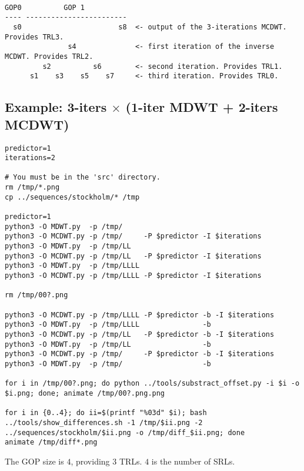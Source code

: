 \begin{verbatim}

GOP0          GOP 1
---- ------------------------
  s0                       s8  <- output of the 3-iterations MCDWT. Provides TRL3.
               s4              <- first iteration of the inverse MCDWT. Provides TRL2.
         s2          s6        <- second iteration. Provides TRL1.
      s1    s3    s5    s7     <- third iteration. Provides TRL0.

\end{verbatim}

\subsection*{Example: 3-iters $\times$ (1-iter MDWT + 2-iters MCDWT)}

\begin{verbatim}
predictor=1
iterations=2

# You must be in the 'src' directory.
rm /tmp/*.png
cp ../sequences/stockholm/* /tmp

predictor=1
python3 -O MDWT.py  -p /tmp/
python3 -O MCDWT.py -p /tmp/     -P $predictor -I $iterations
python3 -O MDWT.py  -p /tmp/LL
python3 -O MCDWT.py -p /tmp/LL   -P $predictor -I $iterations
python3 -O MDWT.py  -p /tmp/LLLL
python3 -O MCDWT.py -p /tmp/LLLL -P $predictor -I $iterations

rm /tmp/00?.png

python3 -O MCDWT.py -p /tmp/LLLL -P $predictor -b -I $iterations
python3 -O MDWT.py  -p /tmp/LLLL               -b
python3 -O MCDWT.py -p /tmp/LL   -P $predictor -b -I $iterations
python3 -O MDWT.py  -p /tmp/LL                 -b
python3 -O MCDWT.py -p /tmp/     -P $predictor -b -I $iterations
python3 -O MDWT.py  -p /tmp/                   -b

for i in /tmp/00?.png; do python ../tools/substract_offset.py -i $i -o $i.png; done; animate /tmp/00?.png.png

for i in {0..4}; do ii=$(printf "%03d" $i); bash ../tools/show_differences.sh -1 /tmp/$ii.png -2 ../sequences/stockholm/$ii.png -o /tmp/diff_$ii.png; done
animate /tmp/diff*.png
\end{verbatim}

The GOP size is $4$, providing $3$ TRLs. $4$ is the number of
SRLs.


